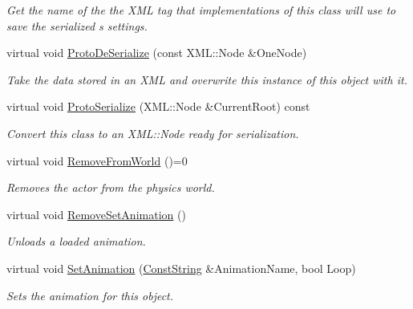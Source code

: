 \begin{DoxyCompactItemize}
\begin{DoxyCompactList}\small\item\em Get the name of the the X\-M\-L tag that implementations of this class will use to save the serialized s settings. \end{DoxyCompactList}\item 
virtual void \hyperlink{classMezzanine_1_1ActorBase_af806d86e70e7fc8d456ac6b9f7df6ef4}{Proto\-De\-Serialize} (const X\-M\-L\-::\-Node \&One\-Node)
\begin{DoxyCompactList}\small\item\em Take the data stored in an X\-M\-L and overwrite this instance of this object with it. \end{DoxyCompactList}\item 
virtual void \hyperlink{classMezzanine_1_1ActorBase_aeae57839dea651eff0517ddad42b7922}{Proto\-Serialize} (X\-M\-L\-::\-Node \&Current\-Root) const 
\begin{DoxyCompactList}\small\item\em Convert this class to an X\-M\-L\-::\-Node ready for serialization. \end{DoxyCompactList}\item 
\hypertarget{classMezzanine_1_1ActorBase_a30910dd0351bc29b2bf88cb3dc8d83db}{virtual void \hyperlink{classMezzanine_1_1ActorBase_a30910dd0351bc29b2bf88cb3dc8d83db}{Remove\-From\-World} ()=0}\label{classMezzanine_1_1ActorBase_a30910dd0351bc29b2bf88cb3dc8d83db}

\begin{DoxyCompactList}\small\item\em Removes the actor from the physics world. \end{DoxyCompactList}\item 
virtual void \hyperlink{classMezzanine_1_1ActorBase_a148df02e486650cba1aa384faf85975f}{Remove\-Set\-Animation} ()
\begin{DoxyCompactList}\small\item\em Unloads a loaded animation. \end{DoxyCompactList}\item 
virtual void \hyperlink{classMezzanine_1_1ActorBase_af81c2b16a0a73608d9af4f9fb7e82ef4}{Set\-Animation} (\hyperlink{namespaceMezzanine_a63cd699ac54b73953f35ec9cfc05e506}{Const\-String} \&Animation\-Name, bool Loop)
\begin{DoxyCompactList}\small\item\em Sets the animation for this object. \end{DoxyCompactList}\end{DoxyCompactItemize}
